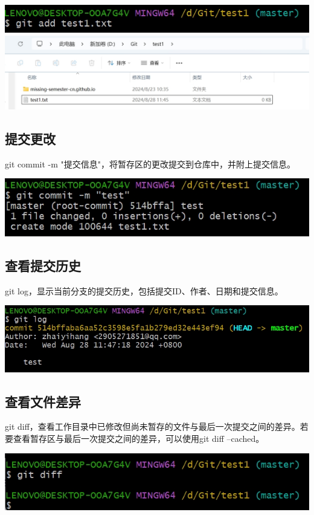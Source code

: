 \documentclass[UTF8,a4paper]{ctexart}
\begin{document}
\begin{sloppypar}
	\includegraphics[width = 16cm]{131}
	\includegraphics[width = 16cm]{132}
	
	\subsection{提交更改}
	git commit -m "提交信息"，将暂存区的更改提交到仓库中，并附上提交信息。
	
	\includegraphics[width = 16cm]{14}
	
	\subsection{查看提交历史}
	git log，显示当前分支的提交历史，包括提交ID、作者、日期和提交信息。
	
	\includegraphics[width = 16cm]{15}
	
	\subsection{查看文件差异}
	git diff，查看工作目录中已修改但尚未暂存的文件与最后一次提交之间的差异。若要查看暂存区与最后一次提交之间的差异，可以使用git diff --cached。
	
	\includegraphics[width = 16cm]{16}
	

\end{sloppypar}
\end{document}
